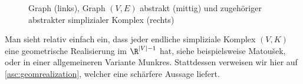 \begin{figure}
    \centering
    \caption{Graph (links), Graph $(V,E)$ abstrakt (mittig) 
        und zugehöriger abstrakter simplizialer Komplex (rechts)}
    \label{asc:fig:graphtocomplex}
\end{figure}

Man sieht relativ einfach ein, dass jeder endliche simpliziale Komplex $(V,K)$ 
eine geometrische Realisierung im $\R^{\abs{V}-1}$ hat, siehe beispielsweise
Matou\v sek\cite[Ch.\,1,]{bookc:matousek03}, oder in einer allgemeineren
Variante Munkres\cite[Ch.\,1,\;\S3,(a)]{bookc:munkres84}. Stattdessen
verweisen wir hier auf \cref{asc:geomrealization}, welcher eine schärfere Aussage
liefert.



